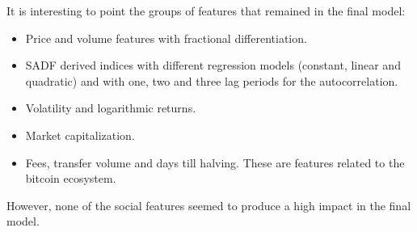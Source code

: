 It is interesting to point the groups of features that remained in the final model:

\begin{itemize}
  \item Price and volume features with fractional differentiation.
  \item SADF derived indices with different regression models (constant, linear and
        quadratic) and with one, two and three lag periods for the autocorrelation.
  \item Volatility and logarithmic returns.
  \item Market capitalization.
  \item Fees, transfer volume and days till halving. These are features related
        to the bitcoin ecosystem. 
\end{itemize}

However, none of the social features seemed to produce a high impact in the final
model.

